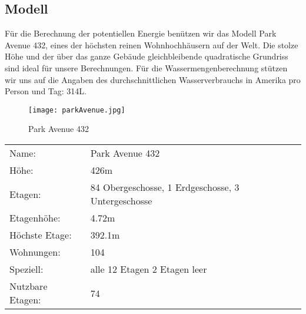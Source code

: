 \subsection{Modell} \label{subsec:modell}

Für die Berechnung der potentiellen Energie benützen wir das Modell Park Avenue 432, eines der höchsten reinen Wohnhochhäusern auf der Welt. Die stolze Höhe und der über das ganze Gebäude gleichbleibende quadratische Grundriss sind ideal für unsere Berechnungen. Für die Wassermengenberechnung stützen wir uns auf die Angaben des durchschnittlichen Wasserverbrauchs in Amerika pro Person und Tag: 314\si{L}. \cite{waterUsAmerica}

\begin{figure} [H]
	\centering
	\texttt{[image: parkAvenue.jpg]}
	\caption{Park Avenue 432 \cite{432_Park_Avenue}}
	\label{fig:Park_Avenue_432}
\end{figure}

\begin{table}[H]
\centering
\begin{tabular}{ll}
Name:				&Park Avenue 432\\
Höhe: 				&426m\\          
Etagen:				&84 Obergeschosse, 1 Erdgeschosse, 3 Untergeschosse\\
Etagenhöhe:			&4.72m\\
Höchste Etage:		&392.1m\\
Wohnungen:			&104\\
Speziell:			&alle 12 Etagen 2 Etagen leer\\    
Nutzbare Etagen: 	&74       
\end{tabular}
\end{table}

\newpage

